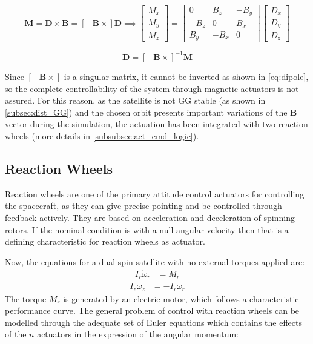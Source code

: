 \begin{equation}
    \boldsymbol{M} = \boldsymbol{D} \times \boldsymbol{B} =
	\left[ -\boldsymbol{B} \times \right] \boldsymbol{D}
	\implies
	\begin{bmatrix}
		M_x \\ M_y \\ M_z
	\end{bmatrix}
	=
	\begin{bmatrix}
		0 & B_z & -B_y \\
		-B_z & 0 & B_x \\
		B_y & -B_x & 0
	\end{bmatrix}
	\begin{bmatrix}
		D_x \\ D_y \\ D_z
	\end{bmatrix}
\end{equation}

\begin{equation} \label{eq:dipole}
	\boldsymbol{D} = \left[ -\boldsymbol{B} \times \right] ^{-1} \boldsymbol{M}
\end{equation}

Since $\left[ -\boldsymbol{B} \times \right]$ is a singular matrix, it cannot be inverted as shown in \autoref{eq:dipole}, so the complete controllability of the system through magnetic actuators is not assured.
For this reason, as the satellite is not GG stable (as shown in \autoref{subsec:dist_GG}) and the chosen orbit presents important variations of the $\boldsymbol{B}$ vector during the simulation, the actuation has been integrated with two reaction wheels (more details in \autoref{subsubsec:act_cmd_logic}).


\subsection{Reaction Wheels}
\label{subsec:reaction_wheels}

Reaction wheels are one of the primary attitude control actuators for controlling the spacecraft, as they can give precise pointing and be controlled through feedback actively. They are based on acceleration and deceleration of spinning rotors. If the nominal condition is with a null angular velocity then that is a defining characteristic for reaction wheels as actuator.

Now, the equations for a dual spin satellite with no external torques applied are:
     \begin{align*}
		  I_{r}\dot{\omega}_{r} &= M_{r}
     \end{align*}
     \begin{align*}
	    I_{z}\dot{\omega}_{z} &= -I_{r}\dot{\omega}_{r}
     \end{align*}
The torque \( M_{r} \) is generated by an electric motor, which follows a characteristic performance curve. The general problem of control with reaction wheels can be modelled through the adequate set of Euler equations which contains the effects of the \( n \) actuators in the expression of the angular momentum:

